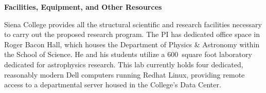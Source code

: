\documentclass[12pt, preprint]{aastex}
\begin{document}
{\Large{\bf Facilities, Equipment, and Other Resources}}
\vspace*{2mm}

%

Siena College provides all the structural scientific and research facilities
necessary to carry out the proposed research program.  The PI has dedicated
office space in Roger Bacon Hall, which houses the Department of Physics \&
Astronomy within the School of Science.  He and his students utilize a
$600$~square foot laboratory dedicated for astrophysics research.  This lab
currently holds four dedicated, reasonably modern Dell computers running Redhat
Linux, providing remote access to a departmental server housed in the College's
Data Center.  

\end{document}
